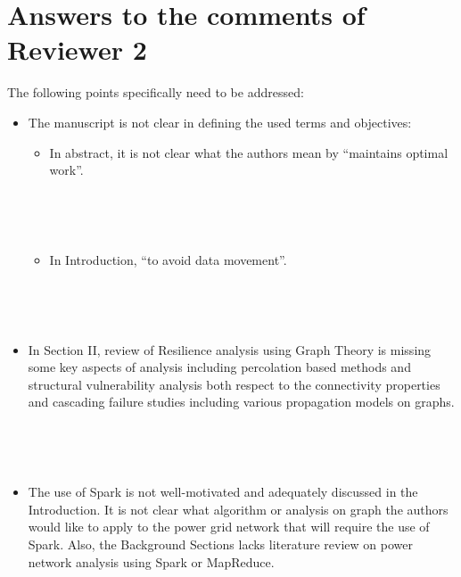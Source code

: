 \section{Answers to the comments of Reviewer 2}
%
%


The following points specifically need to be addressed:

\begin{itemize}
\item The manuscript is not clear in defining the used terms and objectives:
\begin{itemize}
\item In abstract, it is not clear what the authors mean by ``maintains optimal work''.

~


~

\item In Introduction, ``to avoid data movement''. 

~


~
\end{itemize}

\item In Section II, review of Resilience analysis using Graph Theory is missing some key aspects of analysis including percolation based methods and structural vulnerability analysis both respect to the connectivity properties and cascading failure studies including various propagation models on graphs.

~



~


\item The use of Spark is not well-motivated and adequately discussed in the Introduction. It is not clear what algorithm or analysis on graph the authors would like to apply to the power grid network that will require the use of Spark. 
Also, the Background Sections lacks literature review on power network analysis using Spark or MapReduce.


\end{itemize}
